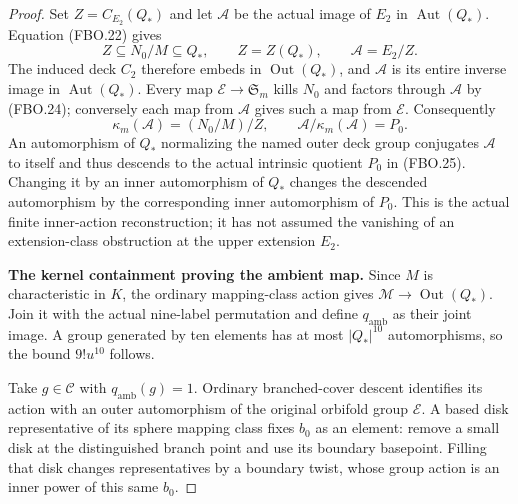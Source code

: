 \begin{proof}
Set $Z=C_{E_2}(Q_*)$ and let $\mathcal A$ be the actual
image of $E_2$ in $\operatorname{Aut}(Q_*)$.
Equation (FBO.22) gives
\[
 Z\subseteq N_0/M\subseteq Q_*,\qquad Z=Z(Q_*),
 \qquad\mathcal A=E_2/Z.
                                                               \tag{FBO.24}
\]
The induced deck $C_2$ therefore embeds in
$\operatorname{Out}(Q_*)$, and $\mathcal A$ is its entire
inverse image in $\operatorname{Aut}(Q_*)$.
Every map $\mathcal E\to\mathfrak S_m$ kills $N_0$ and
factors through $\mathcal A$ by (FBO.24); conversely each map
from $\mathcal A$ gives such a map from $\mathcal E$.
Consequently
\[
 \kappa_m(\mathcal A)=(N_0/M)/Z,
 \qquad\mathcal A/\kappa_m(\mathcal A)=P_0.
                                                               \tag{FBO.25}
\]
An automorphism of $Q_*$ normalizing the named outer deck
group conjugates $\mathcal A$ to itself and thus descends to
the actual intrinsic quotient $P_0$ in (FBO.25).
Changing it by an inner automorphism of $Q_*$ changes the
descended automorphism by the corresponding inner automorphism
of $P_0$.  This is the actual finite inner-action reconstruction;
it has not assumed the vanishing of an extension-class obstruction
at the upper extension $E_2$.

\par\medskip\noindent\textbf{The kernel containment proving the ambient map.}\quad
Since $M$ is characteristic in $K$, the ordinary mapping-class
action gives $\mathcal M\to\operatorname{Out}(Q_*)$.
Join it with the actual nine-label permutation and define
$q_{\mathrm{amb}}$ as their joint image.  A group generated
by ten elements has at most $|Q_*|^{10}$ automorphisms, so
the bound $9!u^{10}$ follows.

Take $g\in\mathcal C$ with $q_{\mathrm{amb}}(g)=1$.
Ordinary branched-cover descent identifies its action with
an outer automorphism of the original orbifold group
$\mathcal E$.  A based disk representative of its sphere
mapping class fixes $b_0$ as an element: remove a small disk
at the distinguished branch point and use its boundary
basepoint.  Filling that disk changes representatives by
a boundary twist, whose group action is an inner power of
this same $b_0$.


\end{proof}
